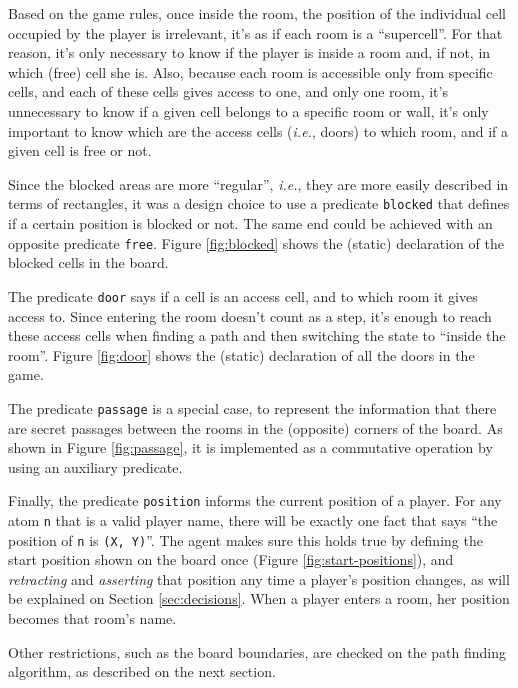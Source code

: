 \documentclass[12pt,a4paper]{article}
\newcommand{\varname}[1]{\texttt{#1}}
\newcommand{\predname}[1]{{\color{MidnightBlue}\varname{#1}}}
\begin{document}
Based on the game rules, once inside the room, the position of the individual cell occupied by the player is irrelevant, it's as if each room is a ``supercell''. For that reason, it's only necessary to know if the player is inside a room and, if not, in which (free) cell she is. Also, because each room is accessible only from specific cells, and each of these cells gives access to one, and only one room, it's unnecessary to know if a given cell belongs to a specific room or wall, it's only important to know which are the access cells (\textit{i.e.}, doors) to which room, and if a given cell is free or not.

Since the blocked areas are more ``regular'', \textit{i.e.}, they are more easily described in terms of rectangles, it was a design choice to use a predicate \predname{blocked} that defines if a certain position is blocked or not. The same end could be achieved with an opposite predicate \predname{free}. Figure \ref{fig:blocked} shows the (static) declaration of the blocked cells in the board.

The predicate \predname{door} says if a cell is an access cell, and to which room it gives access to. Since entering the room doesn't count as a step, it's enough to reach these access cells when finding a path and then switching the state to ``inside the room''. Figure \ref{fig:door} shows the (static) declaration of all the doors in the game.

The predicate \predname{passage} is a special case, to represent the information that there are secret passages between the rooms in the (opposite) corners of the board. As shown in Figure \ref{fig:passage}, it is implemented as a commutative operation by using an auxiliary predicate.

Finally, the predicate \predname{position} informs the current position of a player. For any atom \varname{n} that is a valid player name, there will be exactly one fact that says ``the position of \varname{n} is \varname{(X, Y)}''. The agent makes sure this holds true by defining the start position shown on the board once (Figure \ref{fig:start-positions}), and \textit{retracting} and \textit{asserting} that position any time a player's position changes, as will be explained on Section \ref{sec:decisions}. When a player enters a room, her position becomes that room's name.

Other restrictions, such as the board boundaries, are checked on the path finding algorithm, as described on the next section.
\end{document}

